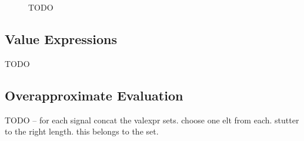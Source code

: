 \begin{figure} 
	\centering
	\caption{\alert{TODO}}
\end{figure}


\subsection{Value Expressions}
\alert{TODO}

\subsection{Overapproximate Evaluation}
\alert{TODO -- for each signal concat the valexpr sets. choose one elt from each. stutter to the right length. this belongs to the set.}

